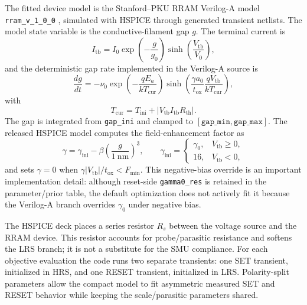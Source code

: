 \documentclass[journal]{IEEEtran}
\begin{document}
The fitted device model is the Stanford--PKU RRAM Verilog-A model
\texttt{rram\_v\_1\_0\_0} \cite{guan2012spice,jiang2014stanford}, simulated
with HSPICE through generated transient netlists.  The model state variable is
the conductive-filament gap $g$.  The terminal current is
\begin{equation}
  I_{\mathrm{tb}}
  = I_0 \exp\left(-\frac{g}{g_0}\right)
    \sinh\left(\frac{V_{\mathrm{tb}}}{V_0}\right),
  \label{eq:stanford-current}
\end{equation}
and the deterministic gap rate implemented in the Verilog-A source is
\begin{equation}
  \frac{dg}{dt}
  =
  -\nu_0
  \exp\left(-\frac{qE_a}{kT_{\mathrm{cur}}}\right)
  \sinh\left(
    \frac{\gamma a_0}{t_{\mathrm{ox}}}
    \frac{qV_{\mathrm{tb}}}{kT_{\mathrm{cur}}}
  \right),
  \label{eq:stanford-gap}
\end{equation}
with
\begin{equation}
  T_{\mathrm{cur}} = T_{\mathrm{ini}} + |V_{\mathrm{tb}}I_{\mathrm{tb}}R_{\mathrm{th}}|.
  \label{eq:temperature}
\end{equation}
The gap is integrated from \texttt{gap\_ini} and clamped to
$[\texttt{gap\_min},\texttt{gap\_max}]$.  The released HSPICE model computes
the field-enhancement factor as
\begin{equation}
  \gamma =
  \gamma_{\mathrm{ini}} -
  \beta\left(\frac{g}{\SI{1}{\nano\meter}}\right)^3,
  \qquad
  \gamma_{\mathrm{ini}} =
  \begin{cases}
    \gamma_0, & V_{\mathrm{tb}}\ge 0,\\
    16, & V_{\mathrm{tb}}<0,
  \end{cases}
  \label{eq:gamma}
\end{equation}
and sets $\gamma=0$ when
$\gamma |V_{\mathrm{tb}}|/t_{\mathrm{ox}}<F_{\min}$.  This negative-bias
override is an important implementation detail: although reset-side
\texttt{gamma0\_res} is retained in the parameter/prior table, the default
optimization does not actively fit it because the Verilog-A branch overrides
$\gamma_0$ under negative bias.

The HSPICE deck places a series resistor $R_s$ between the voltage source and
the RRAM device.  This resistor accounts for probe/parasitic resistance and
softens the LRS branch; it is not a substitute for the SMU compliance.  For
each objective evaluation the code runs two separate transients: one SET
transient, initialized in HRS, and one RESET transient, initialized in LRS.
Polarity-split parameters allow the compact model to fit asymmetric measured
SET and RESET behavior while keeping the scale/parasitic parameters shared.
\end{document}
